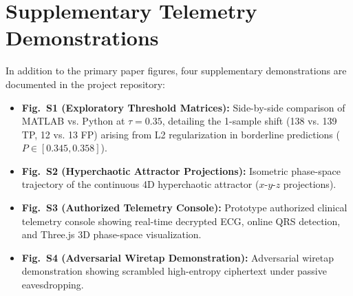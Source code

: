 \documentclass[conference]{IEEEtran}
\begin{document}
\appendices
\section{Supplementary Telemetry Demonstrations}
\label{sec:appendix}

In addition to the primary paper figures, four supplementary demonstrations are documented in the project repository:
\begin{itemize}
    \item \textbf{Fig.~S1 (Exploratory Threshold Matrices):} Side-by-side comparison of MATLAB vs. Python at $\tau = 0.35$, detailing the 1-sample shift (138 vs. 139 TP, 12 vs. 13 FP) arising from L2 regularization in borderline predictions ($P \in [0.345, 0.358]$).
    \item \textbf{Fig.~S2 (Hyperchaotic Attractor Projections):} Isometric phase-space trajectory of the continuous 4D hyperchaotic attractor ($x$-$y$-$z$ projections).
    \item \textbf{Fig.~S3 (Authorized Telemetry Console):} Prototype authorized clinical telemetry console showing real-time decrypted ECG, online QRS detection, and Three.js 3D phase-space visualization.
    \item \textbf{Fig.~S4 (Adversarial Wiretap Demonstration):} Adversarial wiretap demonstration showing scrambled high-entropy ciphertext under passive eavesdropping.
\end{itemize}

\balance


\end{document}
